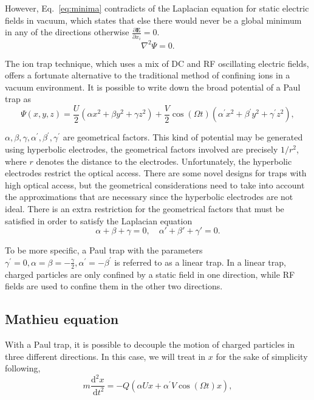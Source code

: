 However, Eq.~\eqref{eq:minima} contradicts of the Laplacian equation for static electric fields in vacuum, which states that else there would never be a global minimum in any of the directions otherwise $\frac{\partial \mathbf{E}}{\partial x_i}=0$.
\begin{equation}
    \nabla^2 \Psi=0.
\end{equation}

The ion trap technique, which uses a mix of DC and RF oscillating electric fields, offers a fortunate alternative to the traditional method of confining ions in a vacuum environment. It is possible to write down the broad potential of a Paul trap as
\begin{equation}\label{eq:rfpotential}
    \Psi(x, y, z)=\frac{U}{2}\left(\alpha x^2+\beta y^2+\gamma z^2\right)+\frac{V}{2} \cos (\Omega t)\left(\alpha^{\prime} x^2+\beta^{\prime} y^2+\gamma^{\prime} z^2\right),
\end{equation}

$\alpha, \beta, \gamma, \alpha^{\prime}, \beta^{\prime}, \gamma^{\prime}$ are geometrical factors. This kind of potential may be generated using hyperbolic electrodes, the geometrical factors involved are precisely $1 / r^2$, where $r$ denotes the distance to the electrodes. Unfortunately, the hyperbolic electrodes restrict the optical access. There are some novel designs for traps with high optical access, but the geometrical considerations need to take into account the approximations that are necessary since the hyperbolic electrodes are not ideal. There is an extra restriction for the geometrical factors that must be satisfied in order to satisfy the Laplacian equation
\begin{equation}
    \alpha+\beta+\gamma=0,\quad \alpha'+\beta'+\gamma'=0.
\end{equation}

To be more specific, a Paul trap with the parameters $\gamma^{\prime}=0, \alpha=\beta=-\frac{\gamma}{2}, \alpha^{\prime}=-\beta^{\prime}$ is referred to as a linear trap. In a linear trap, charged particles are only confined by a static field in one direction, while RF fields are used to confine them in the other two directions.

\subsection{Mathieu equation}

With a Paul trap, it is possible to decouple the motion of charged particles in three different directions. In this case, we will treat in $x$ for the sake of simplicity following,
\begin{equation}\label{eq:motion}
    m \frac{\mathrm{d}^2 x}{\mathrm{~d} t^2}=-Q\left(\alpha U x+\alpha^{\prime} V \cos (\Omega t) x\right),
\end{equation}

